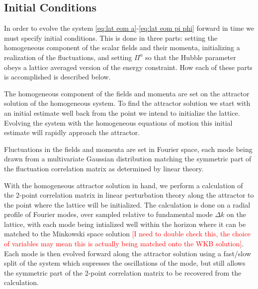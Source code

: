 \subsection{Initial Conditions}
In order to evolve the system \eqref{eq:lat eom a}-\eqref{eq:lat eom pi phi} forward in time we must specify initial conditions. This is done in three parts: setting the homogeneous component of the scalar fields and their momenta, initializing a realization of the fluctuations, and setting $\Pi^a$ so that the Hubble parameter obeys a lattice averaged version of the energy constraint. How each of these parts is accomplished is described below.


The homogeneous component of the fields and momenta are set on the attractor solution of the homogeneous system. To find the attractor solution we start with an initial estimate well back from the point we intend to initialize the lattice. Evolving the system with the homogeneous equations of motion this initial estimate will rapidly approach the attractor.

Fluctuations in the fields and momenta are set in Fourier space, each mode being drawn from a multivariate Gaussian distribution matching the symmetric part of the fluctuation correlation matrix as determined by linear theory.

With the homogeneous attractor solution in hand, we perform a calculation of the 2-point correlation matrix in linear perturbation theory along the attractor to the point where the lattice will be initialized. The calculation is done on a radial profile of Fourier modes, over sampled relative to fundamental mode $\Delta k$ on the lattice, with each mode being intialized well within the horizon where it can be matched to the Minkowski space solution \textcolor{red}{[I need to double check this, the choice of variables may mean this is actually being matched onto the WKB solution]}. Each mode is then evolved forward along the attractor solution using a fast/slow split of the system which supresses the oscillations of the mode, but still allows the symmetric part of the 2-point correlation matrix to be recovered from the calculation.

